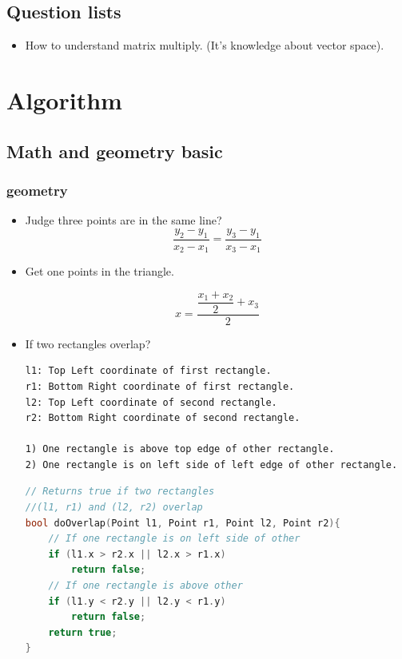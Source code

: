 \documentclass[a4paper,12pt,twoside]{book}
\begin{document}
\section{Question lists}
\begin{itemize}
	\item How to understand matrix multiply. (It's knowledge about vector space). 
\end{itemize}

\chapter{Algorithm}
\section{Math and geometry basic}
\subsection{geometry}
\begin{itemize}
\item Judge three points are in the same line?
\[
\dfrac{y_{2}-y_{1}}{x_{2}-x_{1}}  = \dfrac{y_{3}-y_{1}}{x_{3}-x_{1}}
\]

\item Get one points in the triangle. 

\[
x = \dfrac{\dfrac{x_{1}+x_{2}}{2}+x_{3}}{2}
\]

\item If two rectangles overlap?
\begin{verbatim}
l1: Top Left coordinate of first rectangle.
r1: Bottom Right coordinate of first rectangle.
l2: Top Left coordinate of second rectangle.
r2: Bottom Right coordinate of second rectangle.

1) One rectangle is above top edge of other rectangle.
2) One rectangle is on left side of left edge of other rectangle.
\end{verbatim}

\begin{lstlisting}[frame=single, language=c++]
// Returns true if two rectangles 
//(l1, r1) and (l2, r2) overlap
bool doOverlap(Point l1, Point r1, Point l2, Point r2){
    // If one rectangle is on left side of other
    if (l1.x > r2.x || l2.x > r1.x)
        return false;
    // If one rectangle is above other
    if (l1.y < r2.y || l2.y < r1.y)
        return false;
    return true;
}
\end{lstlisting}

\end{itemize}
\end{document}
